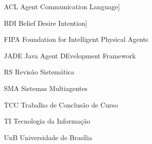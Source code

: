 \begin{siglas}
    \item[ACL] Agent Communication Language]
    \item[BDI] Belief Desire Intention]
    \item[FIPA] Foundation for Intelligent Physical Agents
    \item[JADE] Java Agent DEvelopment Framework
    \item[RS] Revisão Sistemática
    \item[SMA] Sistemas Multiagentes
    \item[TCC] Trabalho de Conclusão de Curso
    \item[TI] Tecnologia da Informação
    \item[UnB] Universidade de Brasília
\end{siglas}
